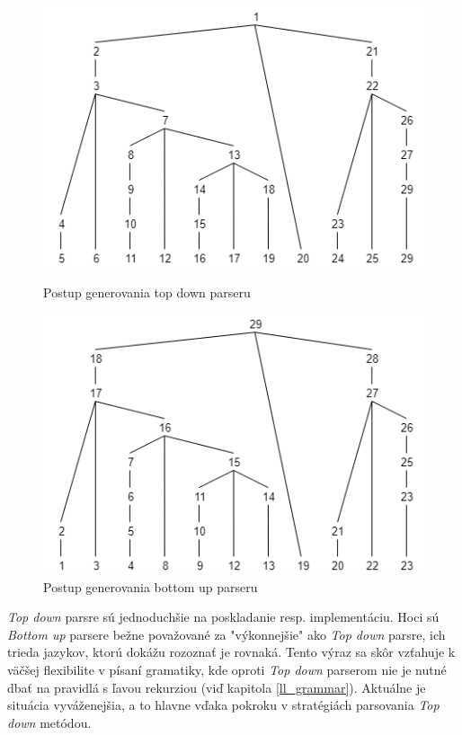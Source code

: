 \begin{figure}[H]
  \centering
  \begin{minipage}[b]{0.45\textwidth}
    \includegraphics[width=\textwidth]{figures/parseTreeExampleTopDown.png}
    \caption{Postup generovania top down parseru}
    \label{fig:parseTreeExampleTopDown}
  \end{minipage}
  \hfill
  \begin{minipage}[b]{0.45\textwidth}
    \includegraphics[width=\textwidth]{figures/parseTreeExampleBottomUp.png}
    \caption{Postup generovania bottom up parseru}
    \label{fig:parseTreeExampleBottomUp}
  \end{minipage}
\end{figure}

\textit{Top down} parsre sú jednoduchšie na poskladanie resp. implementáciu. Hoci sú \textit{Bottom up} parsere bežne považované za "výkonnejšie"{ }ako \textit{Top down} parsre, ich trieda jazykov, ktorú dokážu rozoznať je rovnaká\cite{aho1972theory}. Tento výraz sa skôr vzťahuje k väčšej flexibilite v písaní gramatiky, kde oproti \textit{Top down} parserom nie je nutné dbať na pravidlá s ľavou rekurziou (viď kapitola \ref{ll_grammar}). Aktuálne je situácia vyváženejšia, a to hlavne vďaka pokroku v stratégiách parsovania \textit{Top down} metódou. 

